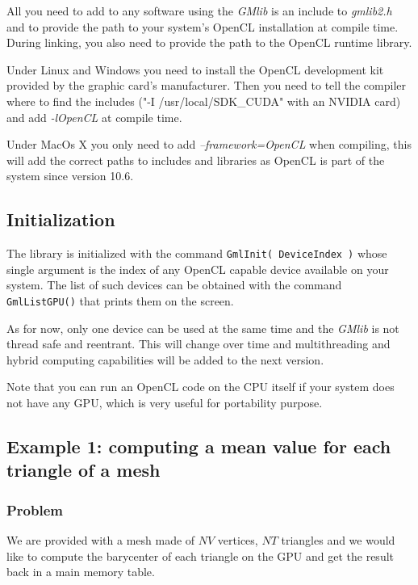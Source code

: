 \documentclass[a4paper,12pt]{article}
\begin{document}
All you need to add to any software using the \emph{GMlib} is an include to \emph{gmlib2.h} and to provide the path to your system's OpenCL installation at compile time. During linking, you also need to provide the path to the OpenCL runtime library.

Under Linux and Windows you need to install the OpenCL development kit provided by the graphic card's manufacturer. Then you need to tell the compiler where to find the includes ("-I /usr/local/SDK\_CUDA" with an NVIDIA card) and add \emph{-lOpenCL} at compile time.

Under MacOs X you only need to add \emph{--framework=OpenCL} when compiling, this will add the correct paths to includes and libraries as OpenCL is part of the system since version 10.6.


\subsection{Initialization}
The library is initialized with the command {\tt GmlInit( DeviceIndex )} whose single argument is the index of any OpenCL capable device available on your system. The list of such devices can be obtained with the command {\tt GmlListGPU()} that  prints them on the screen.

As for now, only one device can be used at the same time and the \emph{GMlib} is not thread safe and reentrant. This will change over time and multithreading and hybrid computing capabilities will be added to the next version.

Note that you can run an OpenCL code on the CPU itself if your system does not have any GPU, which is very useful for portability purpose.

\subsection{Example 1: computing a mean value for each triangle of a mesh}
\label{ex1}
\subsubsection{Problem}
We are provided with a mesh made of $NV$ vertices, $NT$ triangles and we would like to compute the barycenter of each triangle on the GPU and get the result back in a main memory table.
\end{document}
